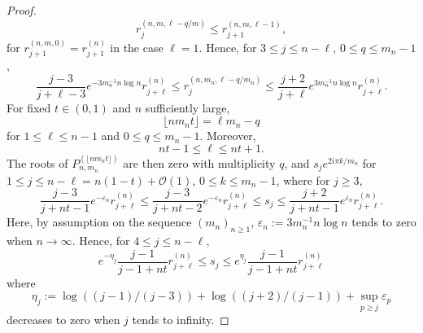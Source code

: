 \documentclass[11pt]{amsart}
\begin{document}
\begin{proof}
$$r_j^{(n,m,\ell-q/m)} \leq r_{j+1}^{(n,m,\ell-1)},$$
for $r_{j+1}^{(n,m,0)} = r_{j+1}^{(n)}$ in the case $\ell = 1$.
Hence, for $3 \leq j \leq n - \ell$, 
$0 \leq q \leq m_n-1$, 
$$\frac{j-3}{j+\ell-3}e^{-3 m_n^{-1} n \log n} 
r_{j+\ell}^{(n)} \leq r_j^{(n,m_n,\ell-q/m_n)} \leq \frac{j+2}{j+\ell} e^{3 m_n^{-1} n \log n} r_{j+\ell}^{(n)}.$$
For fixed $t \in (0,1)$ and $n$ sufficiently large, 
$$\lfloor n m_n t\rfloor = \ell m_n - q$$
for $1 \leq \ell \leq n-1$ and $0 \leq q \leq m_n-1$. Moreover, 
$$nt - 1 \leq \ell \leq nt + 1.$$
The roots of $P_{n,m_n}^{(\lfloor n m_n t \rfloor)}$ are then zero with multiplicity 
$q$, and 
$s_j e^{2 i \pi k/m_n}$
for $1 \leq j \leq n - \ell = n (1-t) + \mathcal{O}(1)$, $0 \leq k \leq m_n-1$, 
where for $j \geq 3$, 
$$\frac{j-3}{j + nt - 1} e^{-\varepsilon_n}
 r^{(n)}_{j+ \ell} \leq \frac{j-3}{j + nt - 2} e^{-\varepsilon_n}
 r^{(n)}_{j+ \ell}
\leq s_j \leq \frac{j+2}{j+ nt -1} e^{\varepsilon_n} r^{(n)}_{j+ \ell}.$$
Here, by assumption on the sequence $(m_n)_{n \geq 1}$, $\varepsilon_n := 3 m_n^{-1} n \log n$ tends to zero when $n \rightarrow \infty$. Hence, 
for $4 \leq j \leq n-\ell$, 
$$ e^{-\eta_j} \frac{j-1}{j-1 + nt} r_{j+ \ell}^{(n)} \leq  s_j \leq e^{\eta_j} \frac{j-1}{j-1 + nt} r_{j+ \ell}^{(n)} $$
where 
$$\eta_j := \log ((j-1)/(j-3)) + 
\log ((j+2)/(j-1)) 
+ \sup_{p \geq j} \varepsilon_p
$$
decreases to zero when $j$ tends to infinity. 
\end{proof}
\end{document}
